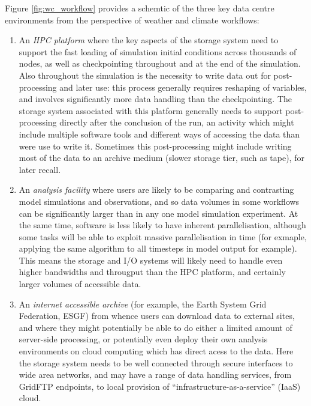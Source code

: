 Figure \ref{fig:wc_workflow} provides a schemtic of the three key
data centre environments from the perspective of weather
and climate workflows:
\begin{enumerate}
    \item An \textit{HPC platform} where the key aspects of the
storage system need to support the fast loading of simulation initial conditions
across thousands of nodes, as well as checkpointing throughout and at the end of
the simulation. Also throughout the simulation is the necessity to write data
out for post-processing and later use: this process generally requires reshaping
of variables, and involves significantly more data handling than the
checkpointing. The storage system associated with this platform generally needs
to support post-processing directly after the conclusion of the run, an activity
which might include multiple software tools and different ways of accessing the
data than were use to write it. Sometimes this post-processing might include
writing most of the data to an archive medium (slower storage tier, such as
tape), for later recall.
    \item An \textit{analysis facility} where users are likely to
    be comparing and contrasting model simulations and observations, and
    so data volumes in some workflows can be significantly larger
    than in any one model simulation experiment. At the same time, software
    is less likely to have inherent parallelisation, although some tasks
    will be able to exploit massive parallelisation in time (for exmaple,
    applying the same algorithm to all timesteps in model output for example).
    This means the storage and I/O systems will likely need to handle even higher
    bandwidths and througput than the HPC platform, and certainly larger
    volumes of accessible data.
    \item An \textit{internet accessible archive} (for example,
    the Earth System Grid Federation, ESGF) from whence users
     can download data to external sites, and where they might potentially
     be able to do either a limited amount of server-side processing, or
     potentially even deploy their own analysis environments on cloud
     computing which has direct acess to the data. Here the storage system
     needs to be well connected through secure interfaces to wide
     area networks, and may have a range of data handling services, from
     GridFTP endpoints, to local provision of ``infrastructure-as-a-service''
     (IaaS) cloud.
\end{enumerate}

